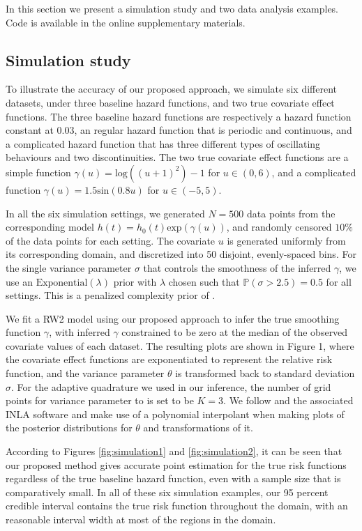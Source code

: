 \documentclass[ba]{imsart}
\begin{document}
In this section we present a simulation study and two data analysis examples. Code is available in the online supplementary materials.

\subsection{Simulation study}\label{subsec:sim}

To illustrate the accuracy of our proposed approach, we simulate six different datasets, under three baseline hazard functions, and two true covariate effect functions. The three baseline hazard functions are respectively a hazard function constant at 0.03, an regular hazard function that is periodic and continuous, and a complicated hazard function that has three different types of oscillating behaviours and two discontinuities. The two true covariate effect functions are a simple function $\gamma(u) = \text{log}((u + 1)^2) - 1$ for $u \in (0,6)$, and a complicated function $\gamma(u) = 1.5 \text{sin}(0.8 u)$ for $ u \in (-5,5)$.

In all the six simulation settings, we  generated $N = 500$ data points from the corresponding model $h(t) = h_{0}(t) \text{exp}(\gamma(u))$, and randomly censored $10\%$ of the data points for each setting. The covariate $u$ is generated uniformly from its corresponding domain, and discretized into 50 disjoint, evenly-spaced bins. For the single variance parameter $\sigma$ that controls the smoothness of the inferred $\gamma$, we use an $\text{Exponential}(\lambda)$ prior with $\lambda$ chosen such that $\mathbb{P}\left( \sigma > 2.5\right) = 0.5$ for all settings. This is a penalized complexity prior of \cite{pcprior}. 

We fit a RW2 model using our proposed approach to infer the true smoothing function $\gamma$, with inferred $\gamma$ constrained to be zero at the median of the observed covariate values of each dataset. The resulting plots are shown in Figure 1, where the covariate effect functions are exponentiated to represent the relative risk function, and the variance parameter $\theta$ is transformed back to standard deviation $\sigma$. For the adaptive quadrature we used in our inference, the number of grid points for variance parameter to is set to be $K = 3$. We follow \citet{inla} and the associated INLA software and make use of a polynomial interpolant when making plots of the posterior distributions for $\theta$ and transformations of it.

According to Figures \ref{fig:simulation1} and \ref{fig:simulation2}, it can be seen that our proposed method gives accurate point estimation for the true risk functions regardless of the true baseline hazard function, even with a sample size that is comparatively small. In all of these six simulation examples, our 95 percent credible interval contains the true risk function throughout the domain, with an reasonable interval width at most of the regions in the domain. 
\end{document}
